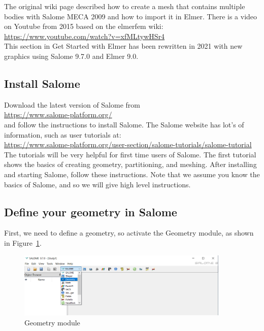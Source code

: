 The original wiki page described how to create a mesh that contains multiple bodies with Salome MECA 2009 and how to import it in Elmer.  There is a video on Youtube from 2015 based on the elmerfem wiki:\\

\url{https://www.youtube.com/watch?v=xfMLtywHSr4}\\

\noindent This section in Get Started with Elmer has been rewritten in 2021 with new graphics using Salome 9.7.0 and Elmer 9.0.

\subsection{Install Salome}

Download the latest version of Salome from\\

\url{https://www.salome-platform.org/}\\

and follow the instructions to install Salome.  The Salome website has lot's of information, such as user tutorials at:\\

\noindent \url{https://www.salome-platform.org/user-section/salome-tutorials/salome-tutorial}\\

The tutorials will be very helpful for first time users of Salome.  The first tutorial shows the basics of creating geometry, partitioning, and meshing.  After installing and starting Salome, follow these instructions.  Note that we assume you know the basics of Salome, and so we will give high level instructions.

\subsection{Define your geometry in Salome}

First, we need to define a geometry, so activate the Geometry module, as shown in Figure~\ref{fg:salome-01}. 

\begin{figure}[H]
\centering
\includegraphics[width=0.9\textwidth]{Salome-01}
\caption{Geometry module}\label{fg:salome-01}
\end{figure}

